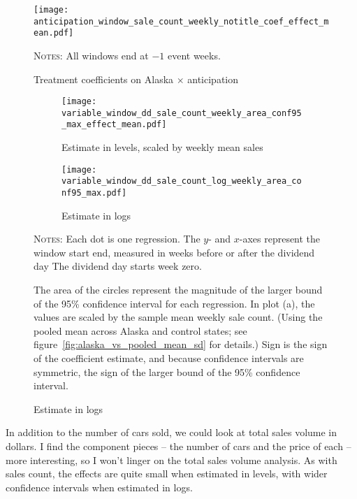 \documentclass[11pt,letterpaper,oneside]{article}
\begin{document}
\begin{doublespacing}
\begin{figure}[hbt]
    \caption{Treatment coefficients on Alaska $\times$ anticipation}
    \label{fig:anticipation_window_sale_count}
    \texttt{[image: anticipation\_window\_sale\_count\_weekly\_notitle\_coef\_effect\_mean.pdf]}

    {\footnotesize
    \textsc{Notes:}
    All windows end at $-1$ event weeks.
    }
\end{figure}

\begin{figure}[hbt]
    \caption{Sales count effects with varying windows}
    \begin{subfigure}{\linewidth}
        \caption{Estimate in levels, scaled by weekly mean sales}
        \texttt{[image: variable\_window\_dd\_sale\_count\_weekly\_area\_conf95\_max\_effect\_mean.pdf]}
    \end{subfigure}
    \begin{subfigure}{\linewidth}
        \caption{Estimate in logs}
        \texttt{[image: variable\_window\_dd\_sale\_count\_log\_weekly\_area\_conf95\_max.pdf]}
    \end{subfigure}


    {\footnotesize
    \textsc{Notes:}
    Each dot is one regression.
    The $y$- and $x$-axes represent the window start end, measured in weeks before or after the dividend day
    The dividend day starts week zero.

     The area of the circles represent the magnitude of the larger bound of the 95\% confidence interval for each regression.
    In plot (a), the values are scaled by the sample mean weekly sale count.
    (Using the pooled mean across Alaska and control states; see figure~\ref{fig:alaska_vs_pooled_mean_sd} for details.)
    Sign is the sign of the coefficient estimate, and because confidence intervals are symmetric, the sign of the larger bound of the 95\% confidence interval.
    }
\end{figure}


In addition to the number of cars sold, we could look at total sales volume in dollars.
I find the component pieces -- the number of cars and the price of each -- more interesting, so I won't linger on the total sales volume analysis.
As with sales count, the effects are quite small when estimated in levels, with wider confidence intervals when estimated in logs.


\end{doublespacing}
\end{document}
